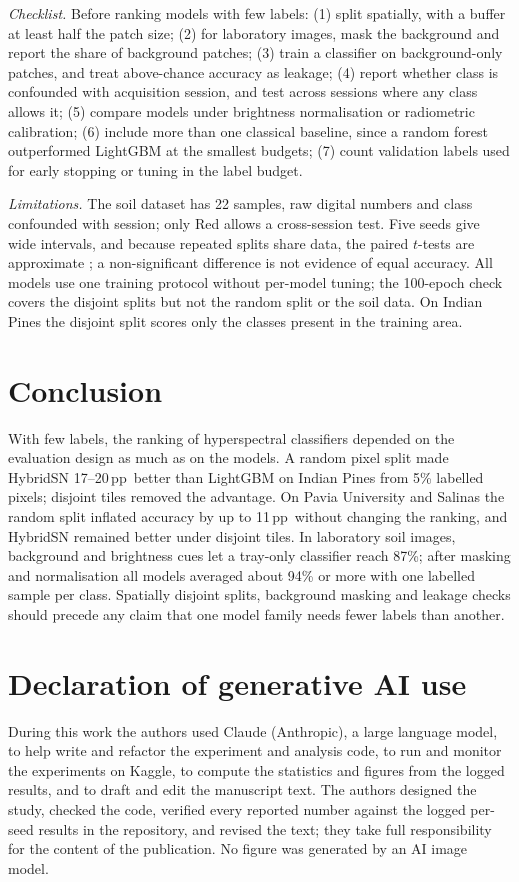 \documentclass[]{interact}
\newcommand{\pp}{\,pp}
\begin{document}
\emph{Checklist.} Before ranking models with few labels: (1) split spatially, with a buffer at least half the patch size; (2) for laboratory images, mask the background and report the share of background patches; (3) train a classifier on background-only patches, and treat above-chance accuracy as leakage; (4) report whether class is confounded with acquisition session, and test across sessions where any class allows it; (5) compare models under brightness normalisation or radiometric calibration; (6) include more than one classical baseline, since a random forest outperformed LightGBM at the smallest budgets; (7) count validation labels used for early stopping or tuning in the label budget.

\emph{Limitations.} The soil dataset has 22 samples, raw digital numbers and class confounded with session; only Red allows a cross-session test. Five seeds give wide intervals, and because repeated splits share data, the paired $t$-tests are approximate \citep{Nadeau2003}; a non-significant difference is not evidence of equal accuracy. All models use one training protocol without per-model tuning; the 100-epoch check covers the disjoint splits but not the random split or the soil data. On Indian Pines the disjoint split scores only the classes present in the training area.

\section{Conclusion}
With few labels, the ranking of hyperspectral classifiers depended on the evaluation design as much as on the models. A random pixel split made HybridSN 17--20\pp\ better than LightGBM on Indian Pines from 5\% labelled pixels; disjoint tiles removed the advantage. On Pavia University and Salinas the random split inflated accuracy by up to 11\pp\ without changing the ranking, and HybridSN remained better under disjoint tiles. In laboratory soil images, background and brightness cues let a tray-only classifier reach 87\%; after masking and normalisation all models averaged about 94\% or more with one labelled sample per class. Spatially disjoint splits, background masking and leakage checks should precede any claim that one model family needs fewer labels than another.

\section*{Declaration of generative AI use}
During this work the authors used Claude (Anthropic), a large language model, to help write and refactor the experiment and analysis code, to run and monitor the experiments on Kaggle, to compute the statistics and figures from the logged results, and to draft and edit the manuscript text. The authors designed the study, checked the code, verified every reported number against the logged per-seed results in the repository, and revised the text; they take full responsibility for the content of the publication. No figure was generated by an AI image model.
\end{document}
